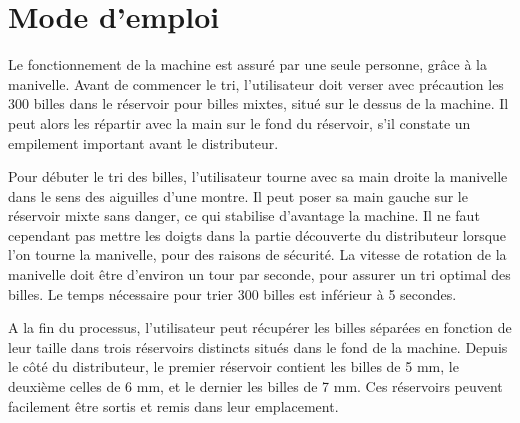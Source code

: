 \chapter{Mode d'emploi}
Le fonctionnement de la machine est assuré par une seule personne, grâce à la manivelle. Avant de commencer le tri, l'utilisateur doit verser avec précaution les 300 billes dans le réservoir pour billes mixtes, situé sur le dessus de la machine. Il peut alors les répartir avec la main sur le fond du réservoir, s'il constate un empilement important avant le distributeur.

Pour débuter le tri des billes, l'utilisateur tourne avec sa main droite la manivelle dans le sens des aiguilles d'une montre. Il peut poser sa main gauche sur le réservoir mixte sans danger, ce qui stabilise d'avantage la machine. Il ne faut cependant pas mettre les doigts dans la partie découverte du distributeur lorsque l'on tourne la manivelle, pour des raisons de sécurité. La vitesse de rotation de la manivelle doit être d'environ un tour par seconde, pour assurer un tri optimal des billes. Le temps nécessaire pour trier 300 billes est inférieur à 5 secondes.

A la fin du processus, l'utilisateur peut récupérer les billes séparées en fonction de leur taille dans trois réservoirs distincts situés dans le fond de la machine. Depuis le côté du distributeur, le premier réservoir contient les billes de 5 mm, le deuxième celles de 6 mm, et le dernier les billes de 7 mm. Ces réservoirs peuvent facilement être sortis et remis dans leur emplacement.
